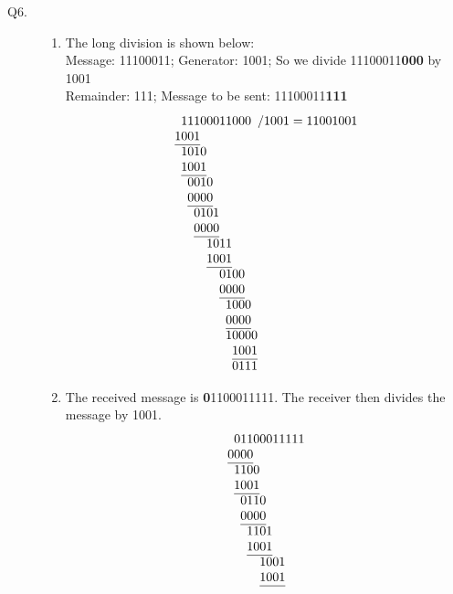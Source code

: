\documentclass{csc_assignment}
\begin{document}
\begin{description}
\newpage
\item[Q6.]
\begin{enumerate}
\item The long division is shown below: \\
Message: 11100011; Generator: 1001; So we divide 11100011\textbf{000} by 1001\\
Remainder: 111; Message to be sent: 11100011\textbf{111}
\[\setlength{\arraycolsep}{0pt}
\begin{array}[t]{*{16}{l}}
	&1&1&1&0&0&0&1&1&0&0&0\\
	1&0&0&1\\ \cline{1-4}
	&1&0&1&0\\
	&1&0&0&1&&&&&&&&&&&\\\cline{2-5}
	&&0&0&1&0&&&&&&&&&&\\
	&&0&0&0&0&&&&&&&&&&\\\cline{3-6}
	&&&0&1&0&1&&&&&&&&&\\
	&&&0&0&0&0&&&&&&&&&\\\cline{4-7}
	&&&&&1&0&1&1&&&&&&&\\
	&&&&&1&0&0&1&&&&&&&\\\cline{6-9}
	&&&&&&&0&1&0&0&&&&&\\
	&&&&&&&0&0&0&0&&&&&\\\cline{8-11}
	&&&&&&&&1&0&0&0&&&&\\
	&&&&&&&&0&0&0&0&&&&\\\cline{9-12}
	&&&&&&&&1&0&0&0&0&&&\\
	&&&&&&&&&1&0&0&1\\\cline{10-16}
	&&&&&&&&&0&1&1&1&&&\\
\end{array}/1001=11001001
\]
\item The received message is \textbf{0}1100011111. The receiver then divides the message by 1001.
\[\setlength{\arraycolsep}{0pt}
\begin{array}[t]{*{16}{l}}
	&0&1&1&0&0&0&1&1&1&1&1\\
	0&0&0&0\\ \cline{1-4}
	&1&1&0&0\\
	&1&0&0&1&&&&&&&&&&&\\\cline{2-5}
	&&0&1&1&0&&&&&&&&&&\\
	&&0&0&0&0&&&&&&&&&&\\\cline{3-6}
	&&&1&1&0&1&&&&&&&&&\\
	&&&1&0&0&1&&&&&&&&&\\\cline{4-7}
	&&&&&1&0&0&1&&&&&&&\\
	&&&&&1&0&0&1&&&&&&&\\\cline{6-9}

\end{array}\]
\end{enumerate}
\end{description}
\end{document}
